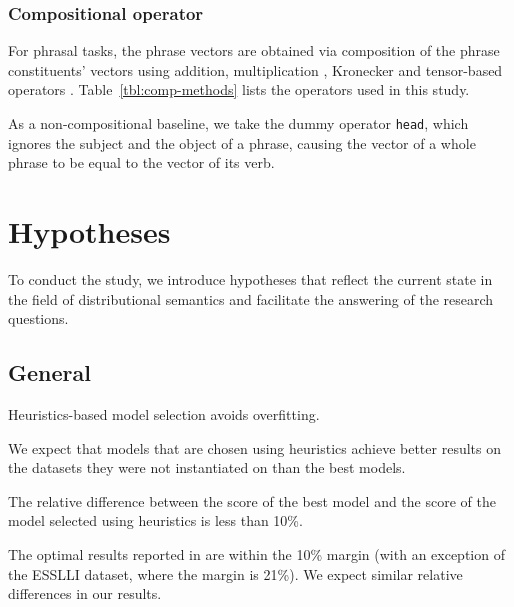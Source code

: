 \subsubsection{Compositional operator}
\label{sec:comp-oper}



For phrasal tasks, the phrase vectors are obtained via composition of the phrase constituents' vectors using addition, multiplication \cite{mitchell2010composition,mitchell-lapata:2008:ACLMain}, Kronecker \cite{Grefenstette:2011:ESC:2145432.2145580} and tensor-based operators \cite{DBLP:journals/corr/abs-1003-4394,kartsadrqpl2014,kartsaklis-sadrzadeh-pulman:2012:POSTERS,Grefenstette:2011:ESC:2145432.2145580}. Table~\ref{tbl:comp-methods} lists the operators used in this study.

As a non-compositional baseline, we take the dummy operator \texttt{head}, which ignores the subject and the object of a phrase, causing the vector of a whole phrase to be equal to the vector of its verb.

\section{Hypotheses}
\label{sec:hypotheses}

To conduct the study, we introduce hypotheses that reflect the current state in the field of distributional semantics and facilitate the answering of the research questions.

\subsection{General}
\label{sec:general-hyp}

\begin{hyp}
\label{hyp:overfitting}
Heuristics-based model selection avoids overfitting.
\end{hyp}

We expect that models that are chosen using heuristics achieve better results on the datasets they were not instantiated on than the best models.

\begin{hyp}
\label{hyp:10percent}
The relative difference between the score of the best model and the score of the model selected using heuristics is less than 10\%.
\end{hyp}

The optimal results reported in  are within the 10\% margin (with an exception of the ESSLLI dataset, where the margin is 21\%). We expect similar relative differences in our results.

